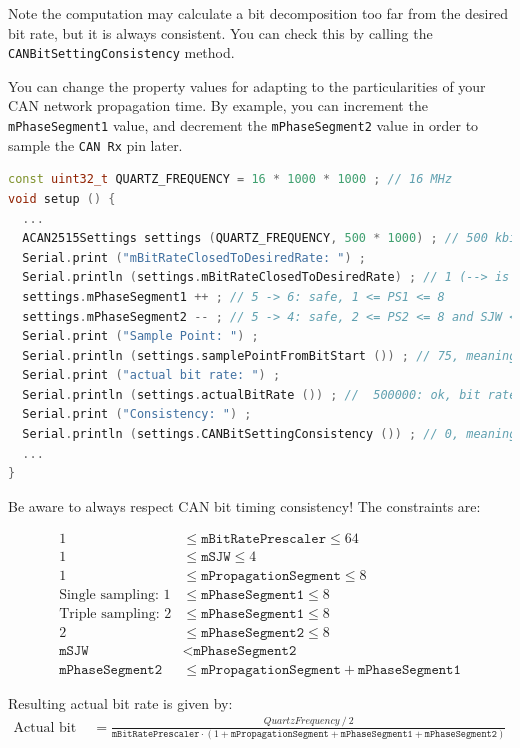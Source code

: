 \documentclass[10pt, a4paper, obeyspaces, openany]{extarticle}
\begin{document}
Note the computation may calculate a bit decomposition too far from the desired bit rate, but it is always consistent. You can check this by calling the \texttt{CANBitSettingConsistency} method.

You can change the property values for adapting to the particularities of your CAN network propagation time. By example, you can increment the \texttt{mPhaseSegment1} value, and decrement the \texttt{mPhaseSegment2} value in order to sample the \texttt{CAN Rx} pin later.

{ \small\begin{lstlisting}[language=c++]
const uint32_t QUARTZ_FREQUENCY = 16 * 1000 * 1000 ; // 16 MHz
void setup () {
  ...
  ACAN2515Settings settings (QUARTZ_FREQUENCY, 500 * 1000) ; // 500 kbit/s
  Serial.print ("mBitRateClosedToDesiredRate: ") ;
  Serial.println (settings.mBitRateClosedToDesiredRate) ; // 1 (--> is true)
  settings.mPhaseSegment1 ++ ; // 5 -> 6: safe, 1 <= PS1 <= 8
  settings.mPhaseSegment2 -- ; // 5 -> 4: safe, 2 <= PS2 <= 8 and SJW <= PS2
  Serial.print ("Sample Point: ") ;
  Serial.println (settings.samplePointFromBitStart ()) ; // 75, meaning 75%
  Serial.print ("actual bit rate: ") ;
  Serial.println (settings.actualBitRate ()) ; //  500000: ok, bit rate did not change
  Serial.print ("Consistency: ") ;
  Serial.println (settings.CANBitSettingConsistency ()) ; // 0, meaning Ok
  ...
}
\end{lstlisting}}

Be aware to always respect CAN bit timing consistency! The constraints are:

\begin{align*}
1 & \leqslant \texttt{mBitRatePrescaler} \leqslant 64 \\
1 & \leqslant \texttt{mSJW} \leqslant 4 \\
1 & \leqslant \texttt{mPropagationSegment} \leqslant 8 \\
\text{Single sampling: }1 & \leqslant \texttt{mPhaseSegment1} \leqslant 8\\
\text{Triple sampling: }2 & \leqslant \texttt{mPhaseSegment1} \leqslant 8\\
2 & \leqslant \texttt{mPhaseSegment2} \leqslant 8 \\
\texttt{mSJW} &<\texttt{mPhaseSegment2}\\
\texttt{mPhaseSegment2} & \leqslant \texttt{mPropagationSegment} + \texttt{mPhaseSegment1}
\end{align*}

Resulting actual bit rate is given by:
{\small
\begin{align*}
\text{Actual bit rate} & = \frac{QuartzFrequency~/~2}{\texttt{mBitRatePrescaler} \cdot (1 + \texttt{mPropagationSegment} + \texttt{mPhaseSegment1} + \texttt{mPhaseSegment2})}
\end{align*}
}
\end{document}
